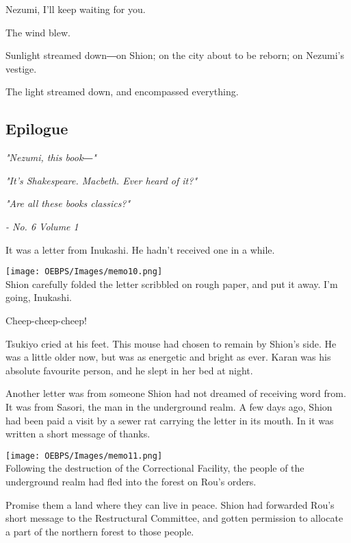 Nezumi, I'll keep waiting for you.

The wind blew.

Sunlight streamed down―on Shion; on the city about to be reborn; on
Nezumi's vestige.

The light streamed down, and encompassed everything.

\hypertarget{index_split_004.htmlux5cux23calibre_pb_8}{}

\protect\hypertarget{index_split_005.html}{}{}

\hypertarget{index_split_005.htmlux5cux23calibre_pb_0}{}

\hypertarget{index_split_005.htmlux5cux23calibre_toc_6}{%
\subsection{Epilogue}\label{index_split_005.htmlux5cux23calibre_toc_6}}

\emph{"Nezumi, this book―"}

\emph{"It's Shakespeare. Macbeth. Ever heard of it?"}

\emph{"Are all these books classics?"}

\emph{- No. 6 Volume 1}

It was a letter from Inukashi. He hadn't received one in a while.

\texttt{[image: OEBPS/Images/memo10.png]}\\

Shion carefully folded the letter scribbled on rough paper, and put it
away. I'm going, Inukashi.

Cheep-cheep-cheep!

Tsukiyo cried at his feet. This mouse had chosen to remain by Shion's
side. He was a little older now, but was as energetic and bright as
ever. Karan was his absolute favourite person, and he slept in her bed
at night.

Another letter was from someone Shion had not dreamed of receiving word
from. It was from Sasori, the man in the underground realm. A few days
ago, Shion had been paid a visit by a sewer rat carrying the letter in
its mouth. In it was written a short message of thanks.

\texttt{[image: OEBPS/Images/memo11.png]}\\

Following the destruction of the Correctional Facility, the people of
the underground realm had fled into the forest on Rou's orders.

Promise them a land where they can live in peace. Shion had forwarded
Rou's short message to the Restructural Committee, and gotten permission
to allocate a part of the northern forest to those people.

